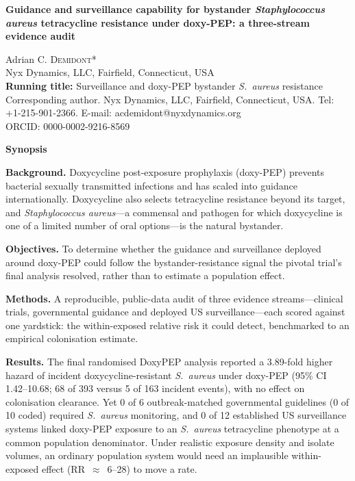 \documentclass[12pt,a4paper]{article}
\newcommand{\sa}{\emph{S.~aureus}}
\newcommand{\Sa}{\emph{Staphylococcus aureus}}
\begin{document}
\begin{center}
{\Large\bfseries Guidance and surveillance capability for bystander \Sa{}
tetracycline resistance under doxy-PEP: a three-stream evidence audit}\\[1.2em]
\end{center}

\noindent Adrian C. \textsc{Demidont}*\\[0.6em]
\noindent Nyx Dynamics, LLC, Fairfield, Connecticut, USA\\[0.6em]

\noindent\textbf{Running title:} Surveillance and doxy-PEP bystander \sa{} resistance\\[0.6em]

\noindent*Corresponding author. Nyx Dynamics, LLC, Fairfield, Connecticut, USA.
Tel: +1-215-901-2366. E-mail: acdemidont@nyxdynamics.org\\
\noindent ORCID: 0000-0002-9216-8569

\vspace{1.5em}

\noindent\textbf{\large Synopsis}

\smallskip
\noindent\textbf{Background.} Doxycycline post-exposure prophylaxis (doxy-PEP)
prevents bacterial sexually transmitted infections and has scaled into guidance
internationally. Doxycycline also selects tetracycline resistance beyond its
target, and \Sa{}---a commensal and pathogen for which doxycycline is one of a
limited number of oral options---is the natural bystander.

\noindent\textbf{Objectives.} To determine whether the guidance and surveillance
deployed around doxy-PEP could follow the bystander-resistance signal the pivotal
trial's final analysis resolved, rather than to estimate a population effect.

\noindent\textbf{Methods.} A reproducible, public-data audit of three evidence
streams---clinical trials, governmental guidance and deployed US
surveillance---each scored against one yardstick: the within-exposed relative
risk it could detect, benchmarked to an empirical colonisation estimate.

\noindent\textbf{Results.} The final randomised DoxyPEP analysis reported a
3.89-fold higher hazard of incident doxycycline-resistant \sa{} under doxy-PEP
(95\% CI 1.42--10.68; 68 of 393 versus 5 of 163 incident events), with no effect
on colonisation clearance. Yet 0 of 6 outbreak-matched governmental guidelines (0 of 10 coded)
required \sa{} monitoring, and 0 of 12 established US surveillance systems linked
doxy-PEP exposure to an \sa{} tetracycline phenotype at a common population
denominator. Under realistic exposure density and isolate volumes, an ordinary
population system would need an implausible within-exposed effect
(RR~$\approx$~6--28) to move a rate.
\end{document}
